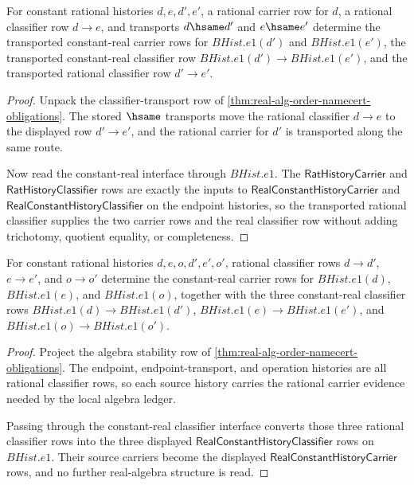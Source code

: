 \begin{theorem}
\label{thm:real-alg-order-classifier-transport-companion}
For constant rational histories $d,e,d',e'$, a rational carrier row for $d$, a rational classifier row $d\to e$, and transports $d\hsame d'$ and $e\hsame e'$ determine the transported constant-real carrier rows for $BHist.e1(d')$ and $BHist.e1(e')$, the transported constant-real classifier row $BHist.e1(d')\to BHist.e1(e')$, and the transported rational classifier row $d'\to e'$.
\end{theorem}
\begin{proof}
Unpack the classifier-transport row of \autoref{thm:real-alg-order-namecert-obligations}. The stored $\hsame$ transports move the rational classifier $d\to e$ to the displayed row $d'\to e'$, and the rational carrier for $d'$ is transported along the same route.

Now read the constant-real interface through $BHist.e1$. The $\mathsf{RatHistoryCarrier}$ and $\mathsf{RatHistoryClassifier}$ rows are exactly the inputs to $\mathsf{RealConstantHistoryCarrier}$ and $\mathsf{RealConstantHistoryClassifier}$ on the endpoint histories, so the transported rational classifier supplies the two carrier rows and the real classifier row without adding trichotomy, quotient equality, or completeness.
\end{proof}

\begin{theorem}
\label{thm:real-alg-order-algebra-row-companion}
For constant rational histories $d,e,o,d',e',o'$, rational classifier rows $d\to d'$, $e\to e'$, and $o\to o'$ determine the constant-real carrier rows for $BHist.e1(d)$, $BHist.e1(e)$, and $BHist.e1(o)$, together with the three constant-real classifier rows $BHist.e1(d)\to BHist.e1(d')$, $BHist.e1(e)\to BHist.e1(e')$, and $BHist.e1(o)\to BHist.e1(o')$.
\end{theorem}
\begin{proof}
Project the algebra stability row of \autoref{thm:real-alg-order-namecert-obligations}. The endpoint, endpoint-transport, and operation histories are all rational classifier rows, so each source history carries the rational carrier evidence needed by the local algebra ledger.

Passing through the constant-real classifier interface converts those three rational classifier rows into the three displayed $\mathsf{RealConstantHistoryClassifier}$ rows on $BHist.e1$. Their source carriers become the displayed $\mathsf{RealConstantHistoryCarrier}$ rows, and no further real-algebra structure is read.
\end{proof}

